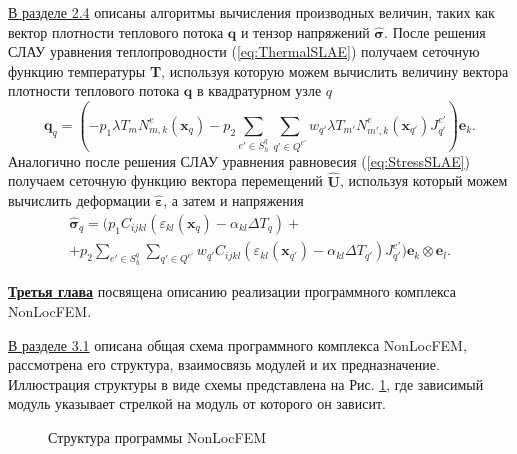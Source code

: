 \underline{В разделе 2.4} описаны алгоритмы вычисления производных величин, таких как вектор плотности теплового потока $\boldsymbol{q}$ и тензор напряжений $\widehat{\boldsymbol{\sigma}}$. После решения СЛАУ уравнения теплопроводности (\ref{eq:ThermalSLAE}) получаем сеточную функцию температуры \textbf{T}, используя которую можем вычислить величину вектора плотности теплового потока $\boldsymbol{q}$ в квадратурном узле $q$
\[
	\boldsymbol{q}_q = 
	\left(	
	-p_1 \lambda T_m N^e_{m,k} (\boldsymbol{x}_q)
	-p_2 \sum\limits_{e' \in S_h^q} \sum\limits_{q' \in Q^{e'}} w_{q'} \lambda T_{m'} N^e_{m',k} (\boldsymbol{x}_{q'}) J^{e'}_{q'}
	\right) \boldsymbol{e}_k.
\]
Аналогично после решения СЛАУ уравнения равновесия (\ref{eq:StressSLAE}) получаем сеточную функцию вектора перемещений  $\widehat{\boldsymbol{U}}$, используя который можем вычислить деформации $\widehat{\boldsymbol{\varepsilon}}$, а затем и напряжения
\begin{multline*}
	\widehat{\boldsymbol{\sigma}}_q =
	\Biggr(
	p_1 C_{ijkl} \left(\varepsilon_{kl} (\boldsymbol{x}_q) - \alpha_{kl} \Delta T_q \right)
	+\\+
	p_2 \sum\limits_{e' \in S_h^q} \sum\limits_{q' \in Q^{e'}} w_{q'} C_{ijkl} \left(\varepsilon_{kl} (\boldsymbol{x}_{q'}) - \alpha_{kl} \Delta T_{q'} \right) J^{e'}_{q'}
	\Biggr) \boldsymbol{e}_k \otimes \boldsymbol{e}_l.
\end{multline*}



\underline{\textbf{Третья глава}} посвящена описанию реализации программного комплекса NonLocFEM.

\underline{В разделе 3.1} описана общая схема программного комплекса NonLocFEM, рассмотрена его структура, взаимосвязь модулей и их предназначение. Иллюстрация структуры в виде схемы представлена на Рис. \ref{pic:NonLocFEMSchema}, где зависимый модуль указывает стрелкой на модуль от которого он зависит.

\begin{figure}[ht]
    \caption{Структура программы NonLocFEM}\label{pic:NonLocFEMSchema}
\end{figure}


